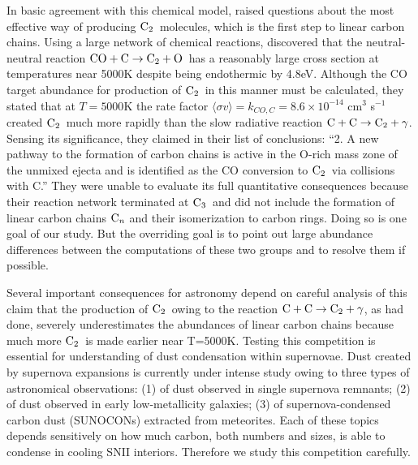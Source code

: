 \documentclass[manuscript]{aastex}
\newcommand{\ctwo}{{\rm C}_2}
\newcommand{\cthree}{{\rm C}_3}
\newcommand{\cenn}{{\rm C}_n}
\newcommand{\twoctoctwo}{${\rm C} + {\rm C} \to \ctwo + \gamma$}
\newcommand{\coctoctwo}{${\rm CO} + {\rm C} \to \ctwo + {\rm O}$}
\begin{document}
In basic agreement with this chemical model, \citet{2009ApJ...703..642C} raised
questions about the most effective way of producing $\ctwo$\ molecules,
which is the
first step to linear carbon chains. Using a large network of chemical
reactions, \citet{2009ApJ...703..642C} discovered that the neutral-neutral
reaction \coctoctwo\
has a reasonably large cross section at temperatures near
5000K despite being endothermic by 4.8eV. Although the CO target abundance for
production of $\ctwo$\ in this manner must be calculated, they stated that at
$T=5000$K the rate factor
$\langle \sigma v \rangle = k_{CO,C} = 8.6 \times 10^{-14}$ cm$^3$ s$^{-1}$
created $\ctwo$\ much more
rapidly than the slow radiative reaction \twoctoctwo.
Sensing its significance,
they claimed in their list of conclusions: ``2. A new pathway to the formation
of carbon chains is active in the O-rich mass zone of the unmixed ejecta and
is identified as the CO conversion to $\ctwo$\ via collisions with C.''  They were
unable to evaluate its full quantitative consequences because their reaction
network terminated at $\cthree$\
and did not include the formation of linear carbon
chains $\cenn$
and their isomerization to carbon rings. Doing so is one goal of our
study. But the overriding goal is to point out large abundance differences
between the computations of these two groups and to resolve them if possible. 

Several important consequences for astronomy depend on careful
analysis of this claim that the production of $\ctwo$\ owing to the reaction
\twoctoctwo, as \citet{1999Sci...283.1290C,2001ApJ...562..480C}
had done, severely
underestimates the abundances of linear carbon chains because much more $\ctwo$\
is made earlier \citep{2010ApJ...713....1C} near T=5000K. Testing this
competition is essential for understanding of dust condensation within
supernovae. Dust created by supernova expansions is currently under intense
study owing to three types of astronomical observations: (1) of dust observed
in single supernova remnants; (2) of dust observed in early low-metallicity
galaxies; (3) of supernova-condensed carbon dust (SUNOCONs) extracted from
meteorites. Each of these topics depends sensitively on how much carbon,
both numbers and sizes, is able to condense in cooling SNII interiors.
Therefore we study this competition carefully.
\end{document}
